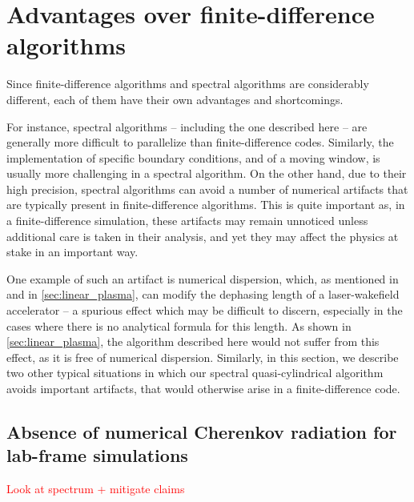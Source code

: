 \documentclass[1p,times,authoryear]{elsarticle}
\newcommand{\comment}[1]{\textcolor{red}{#1}}
\begin{document}
\section{Advantages over finite-difference algorithms}
\label{sec:advantages}

Since finite-difference algorithms and spectral algorithms are
considerably different, each of them have their own advantages and
shortcomings. 

For instance, spectral algorithms -- including the one described here
-- are generally more difficult to parallelize than finite-difference
codes. Similarly, the implementation of specific boundary
conditions, and of a moving window, is usually more challenging in a
spectral algorithm. On the other hand, due to their high precision,
spectral algorithms can avoid a
number of numerical artifacts that are typically present in
finite-difference algorithms. This is quite important as, in a
finite-difference simulation, these artifacts may remain unnoticed
unless additional care is taken in their analysis, and yet they may
affect the physics at stake in an important way.

One example of such an artifact is numerical dispersion, which, as
mentioned in \citep{CowanPRSTAB2013} and in \cref{sec:linear_plasma}, 
can modify the dephasing length of a laser-wakefield accelerator -- a
spurious effect which
may be difficult to discern, especially in the cases where there is no
analytical formula for this length. As shown in
\cref{sec:linear_plasma}, the algorithm described here would not suffer
from this effect, as it is free of numerical dispersion. Similarly, in
this section, we describe two other typical situations in which our spectral
quasi-cylindrical algorithm avoids important artifacts, that would otherwise
arise in a finite-difference code. 

\subsection{Absence of numerical Cherenkov radiation 
for lab-frame simulations}

\comment{Look at spectrum + mitigate claims}
\end{document}
